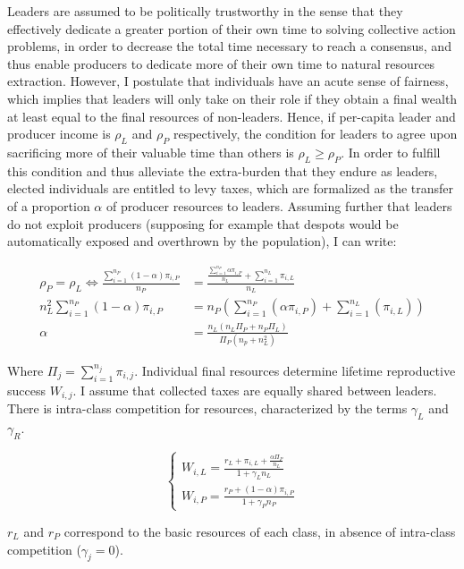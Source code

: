 \documentclass[a4paper]{article}
\begin{document}
Leaders are assumed to be politically trustworthy in the sense that they effectively dedicate a greater portion of their own time to solving collective action problems, in order to decrease the total time necessary to reach a consensus, and thus enable producers to dedicate more of their own time to natural resources extraction. However, I postulate that individuals have an acute sense of fairness, which implies that leaders will only take on their role if they obtain a final wealth at least equal to the final resources of non-leaders. Hence, if per-capita leader and producer income is $\rho_L$ and $\rho_P$ respectively, the condition for leaders to agree upon sacrificing more of their valuable time than others is $\rho_L\ge \rho_P$. In order to fulfill this condition and thus alleviate the extra-burden that they endure as leaders, elected individuals are entitled to levy taxes, which are formalized as the transfer of a proportion $\alpha$ of producer resources to leaders. Assuming further that leaders do not exploit producers (supposing for example that despots would be automatically exposed and overthrown by the population), I can write:

\begin{equation}
\begin{aligned}
\rho_P = \rho_L \Leftrightarrow\frac{\sum_{i=1}^{n_P}(1-\alpha)\pi_{i,P}}{n_P} &= \frac{\frac{\sum_{i=1}^{n_P}\alpha\pi_{i,P}}{n_L}+\sum_{i=1}^{n_L}\pi_{i,L}}{n_L}\\
n_L^2 \sum_{i=1}^{n_P}(1-\alpha)\pi_{i,P} &= n_P\left(\sum_{i=1}^{n_P}(\alpha\pi_{i,P}) + \sum_{i=1}^{n_L}(\pi_{i,L})\right)\\
\alpha &= \frac{n_L\left(n_L\Pi_P+n_P\Pi_L\right)}{\Pi_P\left(n_p+n_L^2\right)}
\end{aligned}
\end{equation}   

Where $\Pi_j=\sum_{i=1}^{n_j}\pi_{i,j}$. Individual final resources determine lifetime reproductive success $W_{i,j}$. I assume that collected taxes are equally shared between leaders. There is intra-class competition for resources, characterized by the terms $\gamma_L$ and $\gamma_R$.

\begin{equation}
\begin{cases}
W_{i,L}=\frac{r_L+\pi_{i,L}+\frac{\alpha\Pi_P}{n_L}}{1+\gamma_L n_L}\\
W_{i,P}=\frac{r_P+(1-\alpha)\pi_{i,P}}{1+\gamma_P n_P}
\end{cases}
\end{equation}

$r_L$ and $r_P$ correspond to the basic resources of each class, in absence of intra-class competition ($\gamma_j=0$).

%
%
\end{document}
